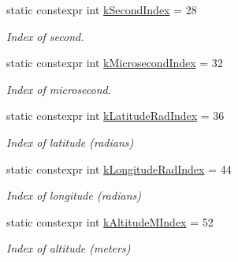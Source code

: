 \begin{DoxyCompactItemize}
static constexpr int \hyperlink{classosse_1_1collaborate_1_1_packet_raw_ab5d403de98f465bae40299dacdb03e52}{k\+Second\+Index} = 28
\begin{DoxyCompactList}\small\item\em Index of second. \end{DoxyCompactList}\item 
\mbox{\label{classosse_1_1collaborate_1_1_packet_raw_a6222188bd78bce81a9b862e861ec5e6c}} 
static constexpr int \hyperlink{classosse_1_1collaborate_1_1_packet_raw_a6222188bd78bce81a9b862e861ec5e6c}{k\+Microsecond\+Index} = 32
\begin{DoxyCompactList}\small\item\em Index of microsecond. \end{DoxyCompactList}\item 
\mbox{\label{classosse_1_1collaborate_1_1_packet_raw_a2f76ff5a4311b920ce08eaf3cfde80d1}} 
static constexpr int \hyperlink{classosse_1_1collaborate_1_1_packet_raw_a2f76ff5a4311b920ce08eaf3cfde80d1}{k\+Latitude\+Rad\+Index} = 36
\begin{DoxyCompactList}\small\item\em Index of latitude (radians) \end{DoxyCompactList}\item 
\mbox{\label{classosse_1_1collaborate_1_1_packet_raw_a59838866a3feca3649ca2bff73ce7303}} 
static constexpr int \hyperlink{classosse_1_1collaborate_1_1_packet_raw_a59838866a3feca3649ca2bff73ce7303}{k\+Longitude\+Rad\+Index} = 44
\begin{DoxyCompactList}\small\item\em Index of longitude (radians) \end{DoxyCompactList}\item 
\mbox{\label{classosse_1_1collaborate_1_1_packet_raw_a4583fb60c6c3f67e7372c65275fb5f24}} 
static constexpr int \hyperlink{classosse_1_1collaborate_1_1_packet_raw_a4583fb60c6c3f67e7372c65275fb5f24}{k\+Altitude\+M\+Index} = 52
\begin{DoxyCompactList}\small\item\em Index of altitude (meters) \end{DoxyCompactList}\item 

\end{DoxyCompactItemize}
